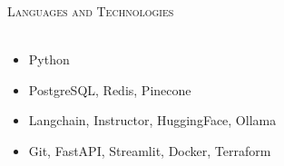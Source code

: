 \documentclass[a4paper]{article}
\newcommand{\lineunder} {
    \vspace*{-8pt} \\
    \hspace*{-18pt} \hrulefill \\
}
\newcommand{\header} [1] {
    {\hspace*{-18pt}\vspace*{6pt} \textsc{#1}}
    \vspace*{-6pt} \lineunder
}
\begin{document}


\header{Languages and Technologies}
\begin{itemize}
    \item Python
    \item PostgreSQL, Redis, Pinecone
    \item Langchain, Instructor, HuggingFace, Ollama
    \item Git, FastAPI, Streamlit, Docker, Terraform
\end{itemize}

\vspace{2mm}

\
\end{document}
